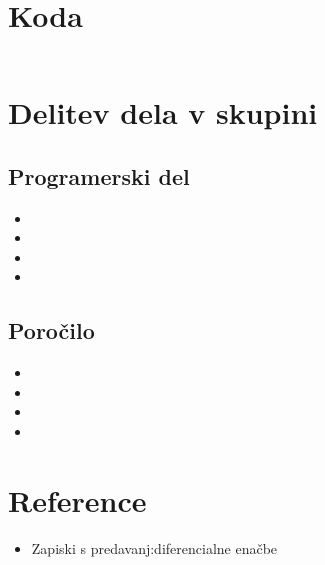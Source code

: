 \documentclass[]{article}
\begin{document}
\section{Koda}
\begin{lstlisting}[language=Octave]

\end{lstlisting}

\section{Delitev dela v skupini}
\subsection{Programerski del}
\begin{itemize}
	\item 
	\item 
	\item 
	\item  
\end{itemize}
\subsection{Poro\v{c}ilo}
\begin{itemize}
	\item 
	\item 
	\item 
	\item  
\end{itemize}
\section{Reference}
\begin{itemize}
	\item Zapiski s predavanj:diferencialne ena\v{c}be
\end{itemize}
\end{document}
